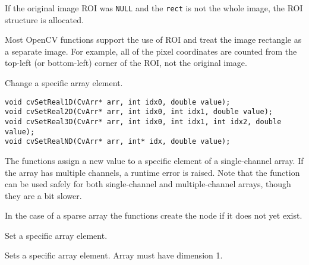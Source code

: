 \begin{description}
\end{description}

If the original image ROI was \texttt{NULL} and the \texttt{rect} is not the whole image, the ROI structure is allocated.

Most OpenCV functions support the use of ROI and treat the image rectangle as a separate image. For example, all of the pixel coordinates are counted from the top-left (or bottom-left) corner of the ROI, not the original image.

\if %
Change a specific array element.

\begin{lstlisting}
void cvSetReal1D(CvArr* arr, int idx0, double value);
void cvSetReal2D(CvArr* arr, int idx0, int idx1, double value);
void cvSetReal3D(CvArr* arr, int idx0, int idx1, int idx2, double value);
void cvSetRealND(CvArr* arr, int* idx, double value);
\end{lstlisting}

\begin{description}
\end{description}

The functions assign a new value to a specific
element of a single-channel array. If the array has multiple channels,
a runtime error is raised. Note that the  function can be used
safely for both single-channel and multiple-channel arrays, though they
are a bit slower.

In the case of a sparse array the functions create the node if it does not yet exist.

\else %

Set a specific array element.


\begin{description}
\end{description}

Sets a specific array element.  Array must have dimension 1.

